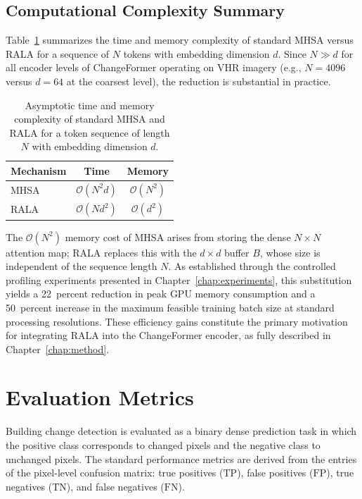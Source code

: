 \subsection{Computational Complexity Summary}

Table~\ref{tab:complexity} summarizes the time and memory complexity of
standard MHSA versus RALA for a sequence of $N$ tokens with embedding
dimension $d$. Since $N \gg d$ for all encoder levels of ChangeFormer
operating on VHR imagery (e.g., $N = 4096$ versus $d = 64$ at the coarsest
level), the reduction is substantial in practice.

\begin{table}[ht]
\centering
\caption{Asymptotic time and memory complexity of standard MHSA and RALA
for a token sequence of length $N$ with embedding dimension $d$.}
\label{tab:complexity}
\begin{tabularx}{0.75\textwidth}{Xcc}
\hline
\textbf{Mechanism} & \textbf{Time} & \textbf{Memory} \\
\hline
MHSA \cite{Vaswani2017Attention}  & $\mathcal{O}(N^2 d)$ & $\mathcal{O}(N^2)$ \\
RALA \cite{Fan2025RALA}           & $\mathcal{O}(N d^2)$ & $\mathcal{O}(d^2)$ \\
\hline
\end{tabularx}
\end{table}

The $\mathcal{O}(N^2)$ memory cost of MHSA arises from storing the dense
$N \times N$ attention map; RALA replaces this with the $d \times d$ buffer
$B$, whose size is independent of the sequence length $N$. As established
through the controlled profiling experiments presented in
Chapter~\ref{chap:experiments}, this substitution yields a 22~percent reduction
in peak GPU memory consumption and a 50~percent increase in the maximum
feasible training batch size at standard processing resolutions. These
efficiency gains constitute the primary motivation for integrating RALA into
the ChangeFormer encoder, as fully described in Chapter~\ref{chap:method}.


\section{Evaluation Metrics}
\label{sec:metrics}

Building change detection is evaluated as a binary dense prediction task in
which the positive class corresponds to changed pixels and the negative class
to unchanged pixels. The standard performance metrics are derived from the
entries of the pixel-level confusion matrix: true positives ($\mathrm{TP}$),
false positives ($\mathrm{FP}$), true negatives ($\mathrm{TN}$), and false
negatives ($\mathrm{FN}$).

